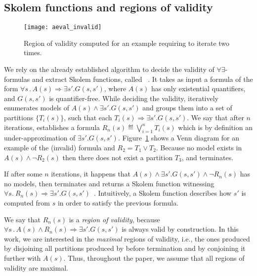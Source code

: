 \subsection{Skolem functions and regions of validity}
\label{sec:aeval}

\begin{figure}[!t]
\centering
\texttt{[image: aeval\_invalid]}
\caption{Region of validity computed for an example requiring \aeval to iterate two times.}
\label{fg:aeval}
\end{figure}


We rely on the already established algorithm to decide the validity of $\forall\exists$-formulas and extract Skolem functions, called \aeval~\cite{fedyukovich2015automated}.
It takes as input a formula of the form $\forall s \,.\,  A(s) \Rightarrow \exists s' . G(s,s')$,
where $A(s)$ has only existential quantifiers, and $G(s,s')$ is quantifier-free.
While deciding the validity, \aeval iteratively enumerates models of
$A(s) \land \exists s'. G(s, s')$ and groups them into a set of partitions $\{T_i(s)\}$, such that each $T_i(s) \Rightarrow \exists s' . G (s, s')$.
We say that after $n$ iterations, \aeval establishes a formula $R_n(s) \eqdef \bigvee_{i=1}^n T_i(s)$ which is by definition an under-approximation of $\exists s' . G (s, s')$.
Figure~\ref{fg:aeval} shows a Venn diagram for an example of the (invalid) formula and $R_2 = T_1 \lor T_2$.
Because no model exists in $A(s) \land \neg{R_2(s)}$ then there does not exist a partition $T_3$, and \aeval terminates.

If after some $n$ iterations, it happens that
$A(s) \land \exists s'. G(s, s') \land \neg R_n(s)$ has no models,
then \aeval terminates and returns a Skolem function witnessing
$\forall s.~ R_n(s) \Rightarrow \exists s' .
G(s,s')$~\cite{katis2016synthesis}. Intuitively, a Skolem function
describes how $s'$ is computed from $s$ in order to satisfy the
previous formula.

We say that $R_n(s)$ is a \emph{region of validity}, because $\forall s \,.\,  A(s) \land R_n(s) \Rightarrow \exists s' . G(s,s')$ is always valid by construction.
In this work, we are interested in the \emph{maximal} regions of validity, i.e., the ones produced by disjoining all partitions produced by \aeval before termination and by conjoining it further with $A(s)$.
Thus, throughout the paper, we assume that all regions of validity are maximal.

